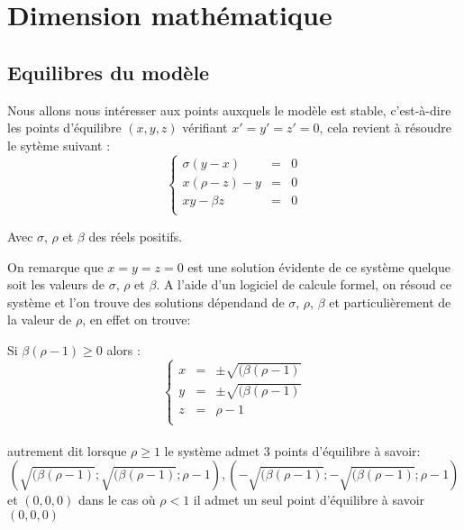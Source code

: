 \section{Dimension mathématique}

\subsection{Equilibres du modèle}
Nous allons nous intéresser aux points auxquels le modèle est stable, c’est-à-dire les points d’équilibre $(x,y,z)$ vérifiant $x'=y'=z'=0$, cela revient à résoudre le sytème suivant :
\[
    \left\{
    \begin{array}{rcl}
        \sigma(y-x)&=&0\\
        x(\rho-z)-y&=&0\\
        xy-\beta z&=&0\\
    \end{array}
    \right.
\]

Avec $\sigma$, $\rho$ et $\beta$ des réels positifs.

On remarque que $x=y=z=0$ est une solution évidente de ce système quelque soit les valeurs de $\sigma$, $\rho$ et $\beta$. A l'aide d'un logiciel de calcule formel, on résoud ce système et l'on trouve des solutions dépendand de $\sigma$, $\rho$, $\beta$ et particulièrement de la valeur de $\rho$, en effet on trouve:

Si $\beta(\rho-1)\geq 0$ alors :
\[
    \left\{
    \begin{array}{rcl}
        x&=& \pm \sqrt{(\beta(\rho-1)}\\
        y&=& \pm \sqrt{(\beta(\rho-1)}\\
        z&=&\rho-1\\
    \end{array}
    \right.
\]\\
autrement dit lorsque $\rho\geq 1$ le système admet 3 points d'équilibre à savoir:
$$(\sqrt{(\beta(\rho-1)}; \sqrt{(\beta(\rho-1)}; \rho-1), (-\sqrt{(\beta(\rho-1)}; -\sqrt{(\beta(\rho-1)}; \rho-1)$$
et $(0,0,0)$ dans le cas où $\rho < 1$ il admet un seul point d'équilibre à savoir $(0,0,0)$
 
